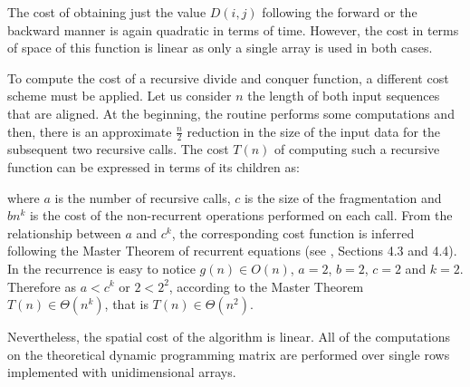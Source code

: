 The cost of obtaining just the value $D(i,j)$ following the forward or the backward manner is again 
quadratic in terms of time. However, the cost in terms of space of this function is linear as 
only a single array is used in both cases.

To compute the cost of a recursive divide and conquer function, a different cost scheme must be applied.
Let us consider $n$ the length of both input sequences that are aligned. At the beginning, the routine
performs some computations and then, there is an approximate $\frac{n}{2}$ reduction in the size of the 
input data for the subsequent two recursive calls. The cost $T(n)$ of computing such a recursive function 
can be expressed in terms of its children as:

\begin{center}
\end{center}

where $a$ is the number of recursive calls, $c$ is the size of the fragmentation and $b n^k$ is the
cost of the non-recurrent operations performed on each call. From the relationship between $a$ and $c^k$, 
the corresponding cost function is inferred following the Master Theorem of recurrent equations (see 
\citet{cormen:2001a}, Sections 4.3 and 4.4). In the \citeauthor{hirschberg:1975a} recurrence is easy to 
notice $g(n) \in O(n)$, $a = 2$, $b = 2$, $c = 2$ and $k = 2$. Therefore as $a<c^k$ or $2<2^2$, according to 
the Master Theorem $T(n) \in \Theta(n^k)$, that is $T(n) \in \Theta(n^2)$. 

Nevertheless, the spatial cost of the \citeauthor{hirschberg:1975a} algorithm is linear. All of the computations 
on the theoretical dynamic programming matrix are performed over single rows implemented with unidimensional
arrays.



